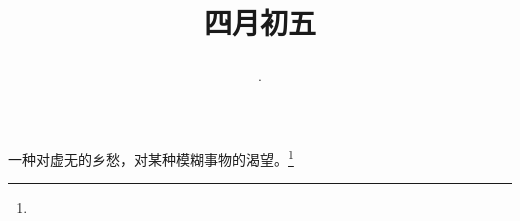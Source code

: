 \title{\date[d=12,m=5,y=2024][year:cn-y,年,month:cn,day:cn,日,·,weekday]·四月初五 }
一种对虚无的乡愁，对某种模糊事物的渴望。\footnote{ }

